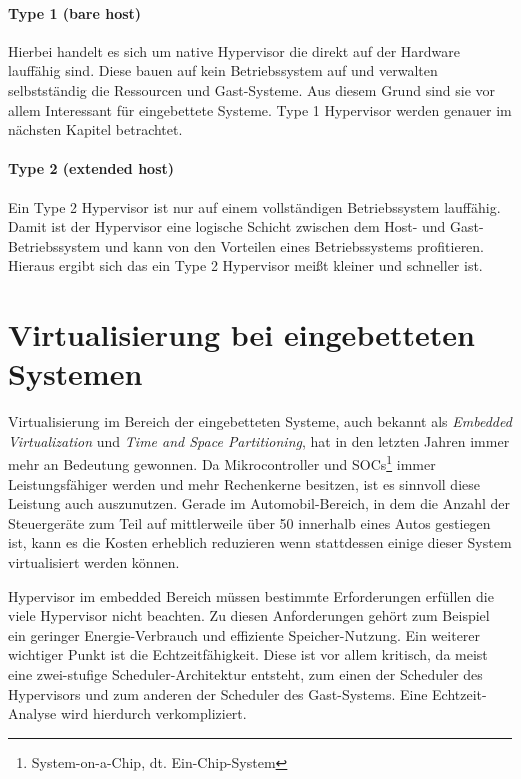 \documentclass[
  a4paper,					    %
  twoside,
  DIV=calc,     				%
  bibliography=totoc,
  cleardoublepage=empty,
  ngerman,     					%
  final       					%
]{scrbook}
\begin{document}
\paragraph{Type 1 (bare host)} Hierbei handelt es sich um native Hypervisor die direkt auf der Hardware lauffähig sind. Diese bauen auf kein Betriebssystem auf und verwalten selbstständig die Ressourcen und Gast-Systeme. Aus diesem Grund sind sie vor allem Interessant für eingebettete Systeme. Type 1 Hypervisor werden genauer im nächsten Kapitel betrachtet.

\paragraph{Type 2 (extended host)} Ein Type 2 Hypervisor ist nur auf einem vollständigen Betriebssystem lauffähig. Damit ist der Hypervisor eine logische Schicht zwischen dem Host- und Gast-Betriebssystem und kann von den Vorteilen eines Betriebssystems profitieren. Hieraus ergibt sich das ein Type 2 Hypervisor meißt kleiner und schneller ist.





\section{Virtualisierung bei eingebetteten Systemen}
\label{sec:EVirtualisierung}
Virtualisierung im Bereich der eingebetteten Systeme, auch bekannt als \emph{Embedded Virtualization} und \emph{Time and Space Partitioning}, hat in den letzten Jahren immer mehr an Bedeutung gewonnen. Da Mikrocontroller und SOCs\footnote{System-on-a-Chip, dt. Ein-Chip-System} immer Leistungsfähiger werden und mehr Rechenkerne besitzen, ist es sinnvoll diese Leistung auch auszunutzen. Gerade im Automobil-Bereich, in dem die Anzahl der Steuergeräte zum Teil auf mittlerweile über 50 innerhalb eines Autos gestiegen ist, kann es die Kosten erheblich reduzieren wenn stattdessen einige dieser System virtualisiert werden können.

Hypervisor im embedded Bereich müssen bestimmte Erforderungen erfüllen die viele Hypervisor nicht beachten. Zu diesen Anforderungen gehört zum Beispiel ein geringer Energie-Verbrauch und effiziente Speicher-Nutzung. Ein weiterer wichtiger Punkt ist die Echtzeitfähigkeit. Diese ist vor allem kritisch, da meist eine zwei-stufige Scheduler-Architektur entsteht, zum einen der Scheduler des Hypervisors und zum anderen der Scheduler des Gast-Systems. Eine Echtzeit-Analyse wird hierdurch verkompliziert.\cite{two_lvl_sched}
\end{document}
